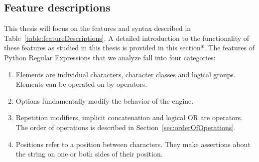 \subsection{Feature descriptions}



This thesis will focus on the features and syntax described in Table~\ref{table:featureDescriptions}.  A detailed introduction to the functionality of these features as studied in this thesis is provided in this section*.  The features of Python Regular Expressions that we analyze fall into four categories:

\begin{enumerate} \itemsep -1pt
\item{Elements are individual characters, character classes and logical groups.  Elements can be operated on by operators.}
\item{Options fundamentally modify the behavior of the engine.}
\item{Repetition modifiers, implicit concatenation and logical OR are operators. The order of operations is described in Section~\ref{sec:orderOfOperations}}.
\item{Positions refer to a position between characters.  They make assertions about the string on one or both sides of their position.}
\end{enumerate}
